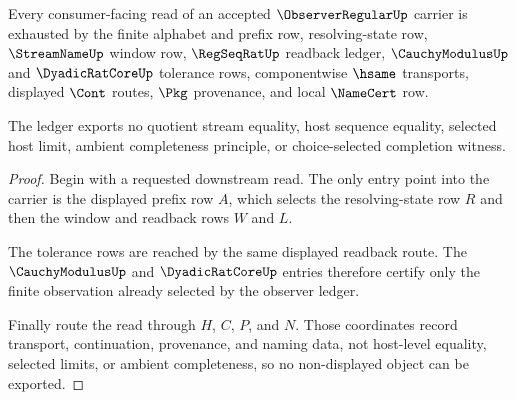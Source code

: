 \begin{theorem}
\label{thm:observerregular-finite-ledger-non-escape}
Every consumer-facing read of an accepted $\ObserverRegularUp$ carrier is exhausted by the finite alphabet and prefix row, resolving-state row, $\StreamNameUp$ window row, $\RegSeqRatUp$ readback ledger, $\CauchyModulusUp$ and $\DyadicRatCoreUp$ tolerance rows, componentwise $\hsame$ transports, displayed $\Cont$ routes, $\Pkg$ provenance, and local $\NameCert$ row.

The ledger exports no quotient stream equality, host sequence equality, selected host limit, ambient completeness principle, or choice-selected completion witness.
\end{theorem}
\begin{proof}
Begin with a requested downstream read. The only entry point into the carrier is the displayed prefix row $A$, which selects the resolving-state row $R$ and then the window and readback rows $W$ and $L$.

The tolerance rows are reached by the same displayed readback route. The $\CauchyModulusUp$ and $\DyadicRatCoreUp$ entries therefore certify only the finite observation already selected by the observer ledger.

Finally route the read through $H$, $C$, $P$, and $N$. Those coordinates record transport, continuation, provenance, and naming data, not host-level equality, selected limits, or ambient completeness, so no non-displayed object can be exported.
\end{proof}

